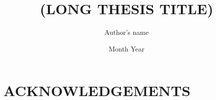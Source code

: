 \documentclass[pdftex]{pucthesis}	          %
\begin{document}

\title[(LONG THESIS TITLE)]{\bf (LONG THESIS TITLE)}       
\author[Author's Name]{Author's name}

\address{Escuela de Ingenier\'ia\\
         Pontificia Universidad Cat\'olica de Chile\\ 
         Vicu\~na Mackenna 4860\\
         Santiago, Chile\\
         {\it Tel.\/} : 56 (2) 354-2000}

\subject{Structural Engineering}
\date{Month Year}
\dedication{Gratefully to my parents and siblings}


\NoChapterPageNumber
{}
\maketitle





 \label{acknowledgements} %
\chapter*{ACKNOWLEDGEMENTS}           

\end{document}

